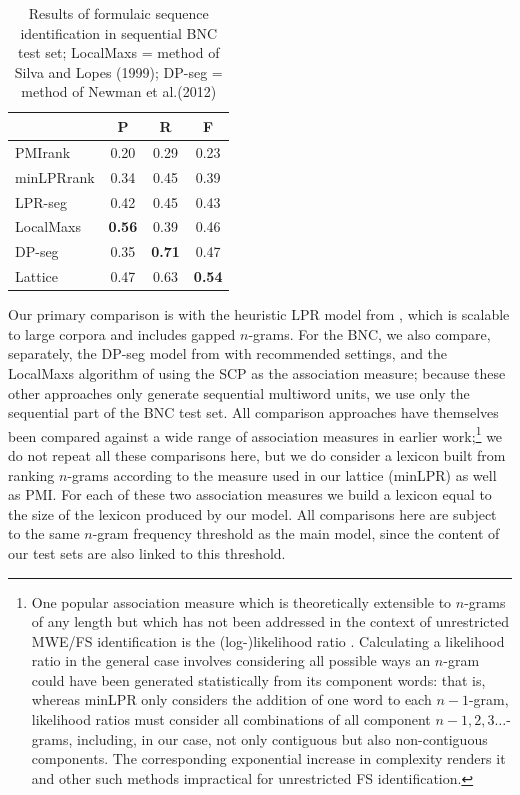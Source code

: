 \documentclass[11pt,letterpaper]{article}
\makeatletter
\def \al {al.\@ }
\makeatother
\begin{document}
 \begin{table}[!bt]
 
 \begin{center}
  \caption{ Results of formulaic sequence identification in sequential BNC test set; LocalMaxs = method of Silva and Lopes (1999); DP-seg = method of Newman et \al (2012)}
	\label{tab:BNC}
	
	 \begin{tabular}{lccc}

       \hline
			& P & R & F\\
			 \hline
			PMIrank & 0.20 & 0.29 & 0.23 \\
			minLPRrank & 0.34 & 0.45 & 0.39 \\
			LPR-seg & 0.42 & 0.45 & 0.43 \\
			LocalMaxs & \bf{0.56} & 0.39 & 0.46 \\
			DP-seg & 0.35 & \bf{0.71} & 0.47 \\
			Lattice & 0.47 & 0.63 & \bf{0.54} \\
       \hline
 \end{tabular}

 \end{center}

 \end{table}	



Our primary comparison is with the heuristic LPR model from , which is scalable to large corpora and includes gapped $n$-grams. For the BNC, we also compare, separately, the DP-seg model from  with recommended settings, and the LocalMaxs algorithm of  using the SCP as the association measure; because these other approaches only generate sequential multiword units, we use only the sequential part of the BNC test set. All comparison approaches have themselves been compared against a wide range of association measures in earlier work;\footnote{One popular association measure which is theoretically extensible to $n$-grams of any length but which has not been addressed in the context of unrestricted MWE/FS identification is the (log-)likelihood ratio \cite{Dunning93}. Calculating a likelihood ratio in the general case involves considering all possible ways an $n$-gram could have been generated statistically from its component words: that is, whereas minLPR only considers the addition of one word to each $n-1$-gram, likelihood ratios must consider all combinations of all component $n-1,2,3\ldots$-grams, including, in our case, not only contiguous but also non-contiguous components. The corresponding exponential increase in complexity renders it and other such methods impractical for unrestricted FS identification.} we do not repeat all these comparisons here, but we do consider a lexicon built from ranking $n$-grams according to the measure used in our lattice (minLPR) as well as PMI. For each of these two association measures we build a lexicon equal to the size of the lexicon produced by our model. All comparisons here are subject to the same $n$-gram frequency threshold as the main model, since the content of our test sets are also linked to this threshold.
\end{document}

